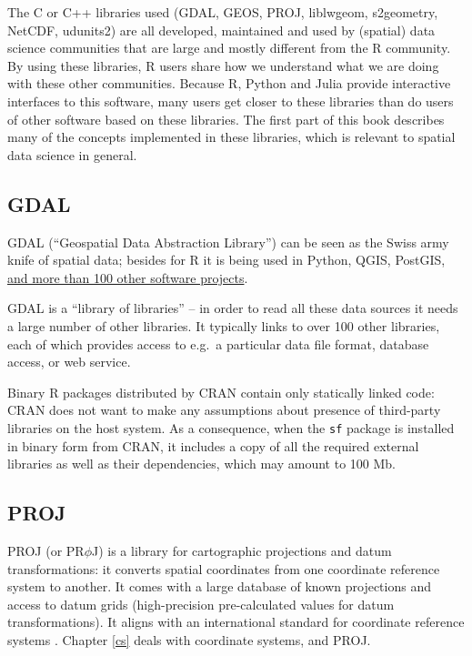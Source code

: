 \documentclass[]{book}
\begin{document}
The C or C++ libraries used (GDAL, GEOS, PROJ, liblwgeom, s2geometry,
NetCDF, udunits2) are all developed, maintained and used by (spatial)
data science communities that are large and mostly different from
the R community. By using these libraries, R users share how we
understand what we are doing with these other communities. Because R,
Python and Julia provide interactive interfaces to this software,
many users get closer to these libraries than do users of other
software based on these libraries. The first part of this book
describes many of the concepts implemented in these libraries,
which is relevant to spatial data science in general.

\hypertarget{gdal}{%
\subsection{GDAL}\label{gdal}}

GDAL (``Geospatial Data Abstraction Library'') can be seen as the
Swiss army knife of spatial data; besides for R it is being
used in Python, QGIS, PostGIS, \href{https://trac.osgeo.org/gdal/wiki/SoftwareUsingGdal}{and more than 100 other software
projects}.

GDAL is a ``library of libraries'' -- in order to read all these data
sources it needs a large number of other libraries. It typically
links to over 100 other libraries, each of which provides access to
e.g.~a particular data file format, database access, or web service.

Binary R packages distributed by CRAN contain only statically linked
code: CRAN does not want to make any assumptions about presence
of third-party libraries on the host system. As a consequence,
when the \texttt{sf} package is installed in binary form from CRAN, it
includes a copy of all the required external libraries as well as
their dependencies, which may amount to 100 Mb.

\hypertarget{proj}{%
\subsection{PROJ}\label{proj}}

PROJ (or PR\(\phi\)J) is a library for cartographic projections
and datum transformations: it converts spatial coordinates
from one coordinate reference system to another. It comes with
a large database of known projections and access to datum grids
(high-precision pre-calculated values for datum transformations). It
aligns with an international standard for coordinate reference
systems \citep{lott2015}. Chapter \ref{cs} deals with coordinate
systems, and PROJ.
\end{document}
